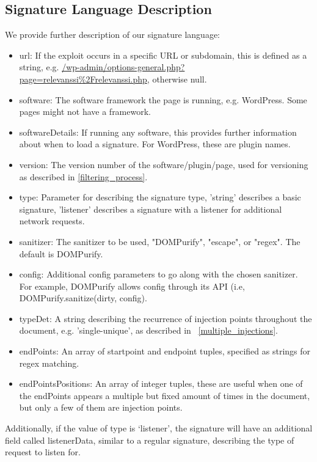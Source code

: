 \subsection{Signature Language Description} \label{appendix:language_specification}

We provide further description of our signature language:
\begin{itemize}
	\item
	url: If the exploit occurs in a specific URL or subdomain, this is defined as a string, e.g.
	\url{/wp-admin/options-general.php?page=relevanssi\%2Frelevanssi.php}, otherwise null.
	\item
	software: The software framework the page is running, e.g. WordPress. Some pages
	might not have a framework.
	\item
	softwareDetails: If running any software, this provides further information about when to load a signature. For WordPress, these are plugin names.
	\item
	version: The version number of the software/plugin/page, used for versioning as described in \autoref{filtering_process}.
	\item 
	type: Parameter for describing the signature type, 'string' describes a basic signature, 'listener' describes a signature with a listener for additional network requests.
	\item 
	sanitizer: The sanitizer to be used, "DOMPurify", "escape", or "regex". The default is DOMPurify.
	\item
	config: Additional config parameters to go along with the chosen sanitizer. For example, DOMPurify allows config through its API (i.e, DOMPurify.sanitize(dirty, config).
	\item
	typeDet: A string describing the recurrence of injection points throughout the document, e.g. 'single-unique', as described in ~\autoref{multiple_injections}.
	\item
	endPoints: An array of startpoint and endpoint tuples, specified as strings for regex matching.
	\item 
	endPointsPositions: An array of integer tuples, these are useful when one of the endPoints appears a multiple but fixed amount of times in the document, but only a few of them are injection points.
\end{itemize}

Additionally, if the value of type is `listener', the signature will have an additional field called listenerData, similar to a regular signature, describing the type of request to listen for.
